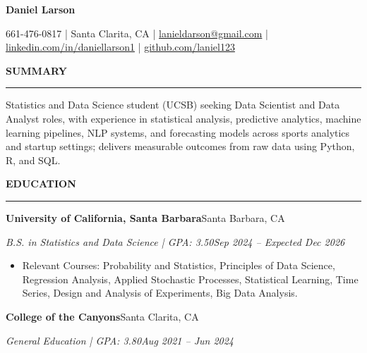 \documentclass[letterpaper,10pt]{article}
\newcommand{\resumeSection}[1]{%
  \vspace{3pt}%
  {\large\bfseries #1}\par
  \vspace{-4pt}\rule{\linewidth}{0.4pt}\par
  \vspace{1pt}%
}
\newcommand{\entry}[4]{%
  {\large\bfseries #1}\hfill #2\par
  \textit{#3}\hfill \textit{#4}\par
}
\newenvironment{bullets}{\begin{itemize}}{\end{itemize}\vspace{1pt}}
\begin{document}
\begin{center}
  {\LARGE\bfseries Daniel Larson}\par
  \vspace{3pt}
  661-476-0817 | Santa Clarita, CA | \href{mailto:lanieldarson@gmail.com}{lanieldarson@gmail.com} |
  \href{https://www.linkedin.com/in/daniellarson1}{linkedin.com/in/daniellarson1} |
  \href{https://github.com/laniel123}{github.com/laniel123}
\end{center}

\resumeSection{SUMMARY}
Statistics and Data Science student (UCSB) seeking Data Scientist and Data Analyst roles, with experience in statistical analysis, predictive analytics, machine learning pipelines, NLP systems, and forecasting models across sports analytics and startup settings; delivers measurable outcomes from raw data using Python, R, and SQL.

\resumeSection{EDUCATION}
\entry{University of California, Santa Barbara}{Santa Barbara, CA}
      {B.S. in Statistics and Data Science | GPA: 3.50}{Sep 2024 -- Expected Dec 2026}
\begin{bullets}
  \item Relevant Courses: Probability and Statistics, Principles of Data Science, Regression Analysis, Applied Stochastic Processes, Statistical Learning, Time Series, Design and Analysis of Experiments, Big Data Analysis.
\end{bullets}
\entry{College of the Canyons}{Santa Clarita, CA}
      {General Education | GPA: 3.80}{Aug 2021 -- Jun 2024}
\end{document}
